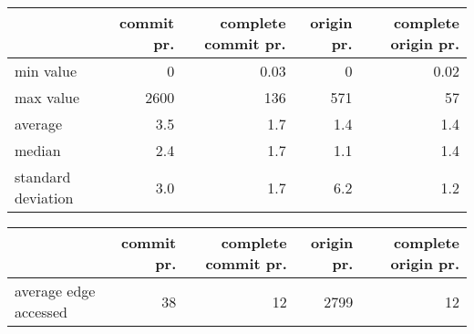 \documentclass[11pt,a4paper]{article}
\begin{document}
\begin{center}
    \begin{tabular}{@{} l *4r @{}}
        \toprule
        \multicolumn{1}{c}{} &
            \textbf{commit pr.} &
            \textbf{complete commit pr.} &
            \textbf{origin pr.} &
            \textbf{complete origin pr.} \\
        \midrule
        min value & 0 & 0.03 & 0 & 0.02 \\
        max value & 2600 & 136 & 571 & 57 \\
        average & 3.5 & 1.7 & 1.4 & 1.4 \\
        median & 2.4 & 1.7 & 1.1 & 1.4 \\
        standard deviation & 3.0 & 1.7 & 6.2 & 1.2 \\
        \bottomrule
    \end{tabular}
\end{center}

\vspace{0.5cm}

\begin{center}
    \begin{tabular}{@{} l *4r @{}}
        \toprule
        \multicolumn{1}{c}{} &
            \textbf{commit pr.} &
            \textbf{complete commit pr.} &
            \textbf{origin pr.} &
            \textbf{complete origin pr.} \\
        \midrule
        average edge accessed & 38 & 12 & 2799 & 12 \\
        \bottomrule
    \end{tabular}
\end{center}
\end{document}

